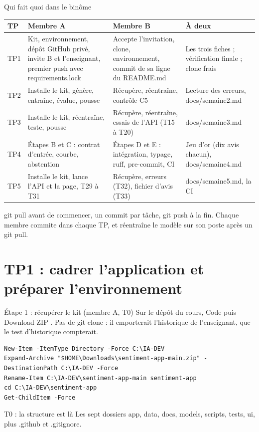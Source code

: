 \documentclass[aspectratio=169,11pt]{beamer}
\newcommand{\co}[1]{{\ttfamily\hyphenchar\font=45\relax #1}}
\renewcommand{\arraystretch}{1.2}
\begin{document}
\begin{frame}{Qui fait quoi dans le binôme}
\tiny\renewcommand{\arraystretch}{1.12}
\begin{tabularx}{\textwidth}{@{}l X X X@{}}
\toprule
\textbf{TP} & \textbf{Membre A} & \textbf{Membre B} & \textbf{À deux} \\
\midrule
TP1 & Kit, environnement, dépôt GitHub privé, invite B et l'enseignant, premier push avec \co{requirements.lock} &
Accepte l'invitation, clone, environnement, commit de sa ligne du \co{README.md} & Les trois fiches ; vérification finale ; clone frais \\
TP2 & Installe le kit, génère, entraîne, évalue, pousse & Récupère, réentraîne, contrôle C5 & Lecture des erreurs, \co{docs/semaine2.md} \\
TP3 & Installe le kit, réentraîne, teste, pousse & Récupère, réentraîne, essais de l'API (T15 à T20) & \co{docs/semaine3.md} \\
TP4 & Étapes B et C : contrat d'entrée, courbe, abstention & Étapes D et E : intégration, typage, ruff, pre-commit, CI & Jeu d'or (dix avis chacun), \co{docs/semaine4.md} \\
TP5 & Installe le kit, lance l'API et la page, T29 à T31 & Récupère, erreurs (T32), fichier d'avis (T33) & \co{docs/semaine5.md}, la CI \\
\bottomrule
\end{tabularx}

\medskip
\small
\co{git pull} avant de commencer, un commit par tâche, \co{git push} à la fin. Chaque membre commite dans
chaque TP, et réentraîne le modèle sur son poste après un \co{git pull}.
\end{frame}

\section{TP1 : cadrer l'application et préparer l'environnement}

\begin{frame}[fragile]{Étape 1 : récupérer le kit (membre A, T0)}
Sur le dépôt du cours, \og Code \fg{} puis \og Download ZIP \fg{}. Pas de \co{git clone} : il emporterait
l'historique de l'enseignant, que le test d'historique compterait.
\begin{lstlisting}
New-Item -ItemType Directory -Force C:\IA-DEV
Expand-Archive "$HOME\Downloads\sentiment-app-main.zip" -DestinationPath C:\IA-DEV -Force
Rename-Item C:\IA-DEV\sentiment-app-main sentiment-app
cd C:\IA-DEV\sentiment-app
Get-ChildItem -Force
\end{lstlisting}
\begin{exampleblock}{T0 : la structure est là}
Les sept dossiers \co{app}, \co{data}, \co{docs}, \co{models}, \co{scripts}, \co{tests}, \co{ui}, plus
\co{.github} et \co{.gitignore}.
\end{exampleblock}
\end{frame}
\end{document}
